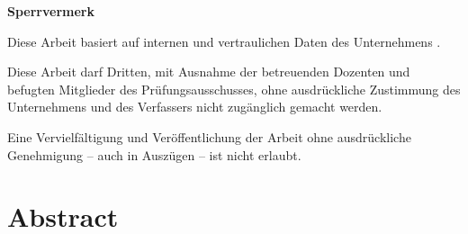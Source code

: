 \hsmaautor

%
{%
\vspace{11cm}
\color{red}\textsf{\large\textbf{Sperrvermerk}}

Diese Arbeit basiert auf internen und vertraulichen Daten des Unternehmens \hsmafirma.

Diese Arbeit darf Dritten, mit Ausnahme der betreuenden Dozenten und befugten Mitglieder des Prüfungsausschusses, ohne ausdrückliche Zustimmung des Unternehmens und des Verfassers nicht zugänglich gemacht werden.

Eine Vervielfältigung und Veröffentlichung der Arbeit ohne ausdrückliche Genehmigung -- auch in Auszügen -- ist nicht erlaubt.
\color{black}
}{}

\cleardoublepage

\chapter*{Abstract}

%
{
  \subsubsection*{\hsmatitelde}
  \hsmaabstractde
  \begin{otherlanguage}{english}
    \subsubsection*{\hsmatitelen}
    \hsmaabstracten
  \end{otherlanguage}
}
{
  \subsubsection*{\hsmatitelen}
  \hsmaabstracten
  \begin{otherlanguage}{ngerman}
    \subsubsection*{\hsmatitelde}
    \hsmaabstractde
  \end{otherlanguage}
}

